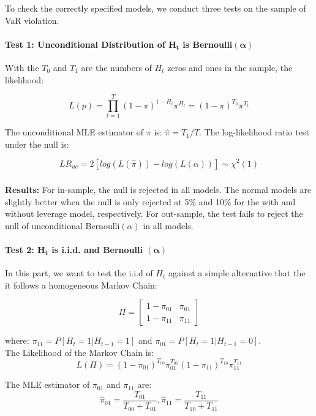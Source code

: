 \documentclass[a4paper]{article}
\begin{document}
To check the correctly specified models, we conduct three tests on the sample of VaR violation.

\paragraph{Test 1: Unconditional Distribution of $\mathbf{H_t}$ is Bernoulli$\mathbf{(\alpha)}$} 

With the $T_0$ and $T_1$ are the numbers of $H_t$ zeros and ones in the sample, the likelihood:

\[L(p) = \prod^{T}_{t=1}(1-\pi)^{1-H_t} \pi^{H_t} = (1-\pi)^{T_0} \pi^{T_1}\]

The unconditional MLE estimator of $\pi$ is: $\hat{\pi} = T_1 / T$. The log-likelihood ratio test under the null is:

\[LR_{uc} = 2[log(L(\hat{\pi})) - log(L(\alpha))] \sim \chi^2(1)\]

\subparagraph*{}
\textbf{Results:} For in-sample, the null is rejected in all models. The normal models are slightly better when the null is only rejected at 5\% and 10\% for the with and without leverage model, respectively. For out-sample, the test fails to reject the null of unconditional Bernoulli$(\alpha)$ in all models.



\paragraph{Test 2: $\mathbf{H_t}$ is i.i.d. and Bernoulli $\mathbf{(\alpha)}$}

In this part, we want to test the i.i.d of $H_t$ against a simple alternative that the it follows a homogeneous Markov Chain:

\[\Pi = \begin{bmatrix}
    1 - \pi_{01} & \pi_{01}\\
    1 - \pi_{11} & \pi_{11}
  \end{bmatrix}\]
  
where: $\pi_{11} = P[H_t=1 | H_{t-1}=1]$ and $\pi_{01} = P[H_t = 1 | H_{t-1} = 0]$. \\

The Likelihood of the Markov Chain is:
\[L(\Pi) = (1-\pi_{01})^{T_{00}} \pi_{01}^{T_{01}} (1-\pi_{11})^{T_{10}} \pi_{11}^{T_{11}}\]

The MLE estimator of $\pi_{01}$ and $\pi_{11}$ are:
\[\hat{\pi}_{01} = \frac{T_{01}}{T_{00}+T_{01}}, \hat{\pi}_{11} = \frac{T_{11}}{T_{10} + T_{11}}\]
\end{document}
